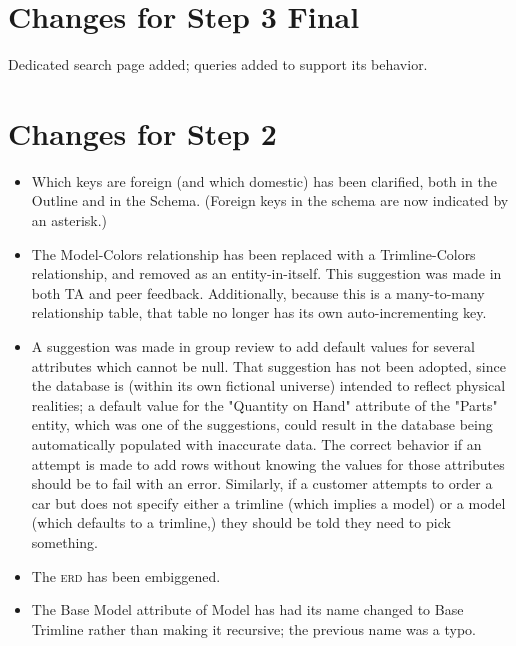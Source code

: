 \documentclass[11pt,letterpaper,oneside]{amsart}
\begin{document}
\section*{Changes for Step 3 Final}

Dedicated search page added; queries added to support its behavior.



\section*{Changes for Step 2}

\begin{itemize}

\item Which keys are foreign (and which domestic) has been clarified, both in the Outline and in the Schema.  (Foreign keys in the schema are now indicated by an asterisk.)

\item The Model-Colors relationship has been replaced with a Trimline-Colors relationship, and removed as an entity-in-itself.  This suggestion was made in both TA and peer feedback.  Additionally, because this is a many-to-many relationship table, that table no longer has its own auto-incrementing key.

\item A suggestion was made in group review to add default values for several attributes which cannot be null.  That suggestion has not been adopted, since the database is (within its own fictional universe) intended to reflect physical realities; a default value for the "Quantity on Hand" attribute of the "Parts" entity, which was one of the suggestions, could result in the database being automatically populated with inaccurate data.  The correct behavior if an attempt is made to add rows without knowing the values for those attributes should be to fail with an error.  Similarly, if a customer attempts to order a car but does not specify either a trimline (which implies a model) or a model (which defaults to a trimline,) they should be told they need to pick something.

\item The \textsc{erd} has been embiggened.

\item The Base Model attribute of Model has had its name changed to Base Trimline rather than making it recursive; the previous name was a typo.

\end{itemize}
\end{document}
